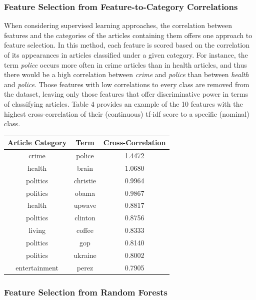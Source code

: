 \documentclass[11pt]{article}
\begin{document}
\subsubsection{Feature Selection from Feature-to-Category Correlations}

When considering supervised learning approaches, the correlation between features and the categories of the articles containing them offers one approach to feature selection.
In this method, each feature is scored based on the correlation of its appearances in articles classified under a given category.
For instance, the term \emph{police} occurs more often in crime articles than in health articles, and thus there would be a high correlation between \emph{crime} and \emph{police} than between \emph{health} and \emph{police}.
Those features with low correlations to every class are removed from the dataset, leaving only those features that offer discriminative power in terms of classifying articles.
Table 4 provides an example of the 10 features with the highest cross-correlation of their (continuous) tf-idf score to a specific (nominal) class.


\begin{center}
\begin{tabular}{ |c|c|c| } 
 \hline
 Article Category & Term & Cross-Correlation \\
 \hline
              crime & police          & 	1.4472 \\
              health & brain           & 	1.0680 \\
              politics & christie        & 	0.9964 \\
              politics & obama           & 	0.9867 \\
              health & upwave          & 	0.8817 \\
              politics & clinton         & 	0.8756 \\
              living & coffee          & 	0.8333 \\
              politics & gop             & 	0.8140 \\
              politics & ukraine         & 	0.8002 \\
              entertainment & perez     & 	0.7905 \\
\hline
\end{tabular}
\end{center}


\subsubsection{Feature Selection from Random Forests}
\end{document}
